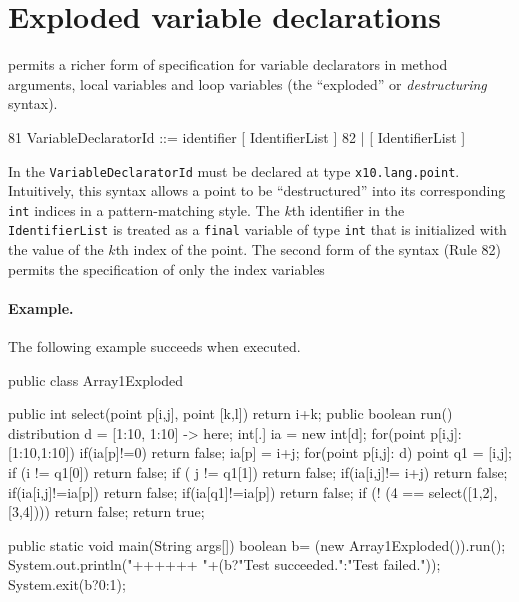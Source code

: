\section{Exploded variable declarations}\label{exploded-syntax}

\Xten{} permits a richer form of specification for variable
declarators in method arguments, local variables and loop variables
(the ``exploded'' or {\em destructuring} syntax).
\begin{x10}
81    VariableDeclaratorId ::= identifier [ IdentifierList ]
82                           | [ IdentifierList ]
\end{x10}
In \XtenCurrVer{} the {\tt VariableDeclaratorId} must be declared at
type {\tt x10.lang.point}. Intuitively, this syntax allows a
point to be ``destructured'' into its corresponding {\tt int} 
indices in a pattern-matching style.
The $k$th identifier in the {\tt
IdentifierList} is treated as a {\tt final} variable of type {\tt int}
that is initialized with the value of the $k$th index of the point. 
The second form of the syntax (Rule 82) permits the specification of only
the index variables

\paragraph{Example.}
The following example succeeds when executed.
\begin{x10}
public class Array1Exploded {
    public int select(point p[i,j], point [k,l]) {
        return i+k;
    }
    public boolean run() {
        distribution d =  [1:10, 1:10] -> here;
        int[.] ia = new int[d];
        for(point p[i,j]: [1:10,1:10]) {
            if(ia[p]!=0) return false;
            ia[p] = i+j;
        }
        for(point p[i,j]: d) {
            point q1 = [i,j];
            if (i != q1[0]) return false;
            if ( j != q1[1]) return false;
            if(ia[i,j]!= i+j) return false;
            if(ia[i,j]!=ia[p]) return false;
            if(ia[q1]!=ia[p]) return false;
        }
        if (! (4 == select([1,2],[3,4]))) return false;
           return true;
   }
        
   public static void main(String args[]) {
        boolean b= (new Array1Exploded()).run();
        System.out.println("++++++ "+(b?"Test succeeded.":"Test failed."));
        System.exit(b?0:1);
   }
}
\end{x10}

 \par  %



